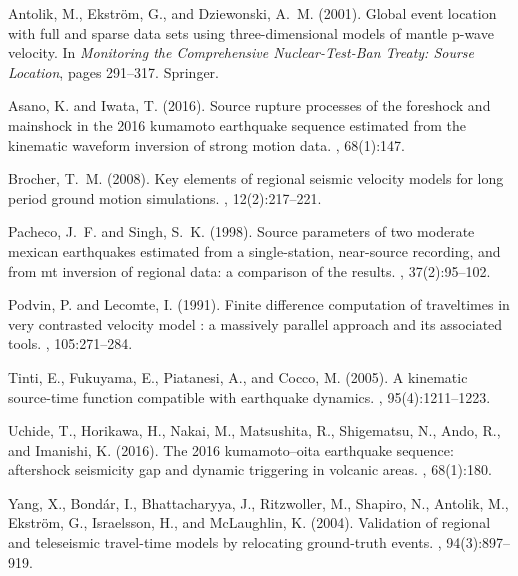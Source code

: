 \documentclass[10pt]{extarticle}
\begin{document}
%                                               
%
\newcommand{\SortNoop}[1]{}
\begin{thebibliography}{}

Antolik, M., Ekstr{\"o}m, G., and Dziewonski, A.~M. (2001).
\newblock Global event location with full and sparse data sets using
  three-dimensional models of mantle p-wave velocity.
\newblock In {\em Monitoring the Comprehensive Nuclear-Test-Ban Treaty: Sourse
  Location}, pages 291--317. Springer.

Asano, K. and Iwata, T. (2016).
\newblock Source rupture processes of the foreshock and mainshock in the 2016
  kumamoto earthquake sequence estimated from the kinematic waveform inversion
  of strong motion data.
, 68(1):147.

Brocher, T.~M. (2008).
\newblock Key elements of regional seismic velocity models for long period
  ground motion simulations.
, 12(2):217--221.

Pacheco, J.~F. and Singh, S.~K. (1998).
\newblock Source parameters of two moderate mexican earthquakes estimated from
  a single-station, near-source recording, and from mt inversion of regional
  data: a comparison of the results.
, 37(2):95--102.

Podvin, P. and Lecomte, I. (1991).
\newblock Finite difference computation of traveltimes in very contrasted
  velocity model : a massively parallel approach and its associated tools.
, 105:271--284.

Tinti, E., Fukuyama, E., Piatanesi, A., and Cocco, M. (2005).
\newblock A kinematic source-time function compatible with earthquake dynamics.
,
  95(4):1211--1223.

Uchide, T., Horikawa, H., Nakai, M., Matsushita, R., Shigematsu, N., Ando, R.,
  and Imanishi, K. (2016).
\newblock The 2016 kumamoto--oita earthquake sequence: aftershock seismicity
  gap and dynamic triggering in volcanic areas.
, 68(1):180.

Yang, X., Bond{\'a}r, I., Bhattacharyya, J., Ritzwoller, M., Shapiro, N.,
  Antolik, M., Ekstr{\"o}m, G., Israelsson, H., and McLaughlin, K. (2004).
\newblock Validation of regional and teleseismic travel-time models by
  relocating ground-truth events.
,
  94(3):897--919.

\end{thebibliography}
\end{document}
